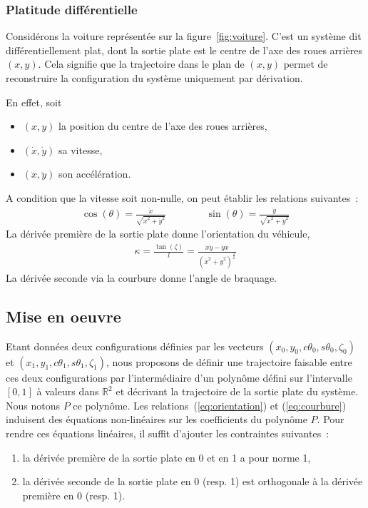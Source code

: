 \documentclass {article}
\newcommand\dx{\dot{x}}
\newcommand\dy{\dot{y}}
\newcommand\ddx{\ddot{x}}
\newcommand\ddy{\ddot{y}}
\def\real{{\mathbb R}}
\begin{document}
\subsubsection* {Platitude différentielle}

Considérons la voiture représentée sur la figure~\ref{fig:voiture}. C'est un système dit différentiellement plat, dont la sortie plate est le centre de l'axe des roues arrières $(x,y)$. Cela signifie que la trajectoire dans le plan de $(x,y)$ permet de reconstruire la configuration du système uniquement par dérivation.

En effet, soit
\begin {itemize}
  \item $(x,y)$ la position du centre de l'axe des roues arrières,
  \item $(\dx, \dy)$ sa vitesse,
  \item $(\ddx, \ddy)$ son accélération.
\end {itemize}
A condition que la vitesse soit non-nulle, on peut établir les relations suivantes~:
\begin {align}\label{eq:orientation}
  \cos(\theta) = \frac{\dx}{\sqrt{\dx^2+\dy^2}} & \hspace {1cm} & \sin(\theta) = \frac{\dy}{\sqrt{\dx^2+\dy^2}}
\end {align}
La dérivée première de la sortie plate donne l'orientation du véhicule,
\begin{align}\label{eq:courbure}
  \kappa = \frac{\tan (\zeta)}{l} = \frac{\dx\ddy - \dy\ddx}{(\dx^2+\dy^2)^{\frac{3}{2}}}
\end{align}
La dérivée seconde via la courbure donne l'angle de braquage.

\subsection* {Mise en oeuvre}

Etant données deux configurations définies par les vecteurs $(x_0,y_0,c\theta_0,s\theta_0,\zeta_0)$ et $(x_1,y_1,c\theta_1,s\theta_1,\zeta_1)$, nous proposons de définir une trajectoire faisable entre ces deux configurations par l'intermédiaire d'un polyn\^ome défini sur l'intervalle $[0,1]$ à valeurs dans $\real^2$ et décrivant la trajectoire de la sortie plate du système. Nous notons $P$ ce polyn\^ome. Les relations~(\ref{eq:orientation}) et (\ref{eq:courbure}) induisent des équations non-linéaires sur les coefficients du polyn\^ome $P$. Pour rendre ces équations linéaires, il suffit d'ajouter les contraintes suivantes~:
\begin{enumerate}
\item la dérivée première de la sortie plate en 0 et en 1 a pour norme 1,
\item la dérivée seconde de la sortie plate en 0 (resp. 1) est orthogonale à la dérivée première en 0 (resp. 1).
\end{enumerate}
\end{document}
